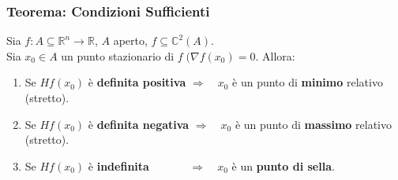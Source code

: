 \documentclass[x11names]{article}
\begin{document}
	\newpage\begin{center}
		\colorbox{myred}{\begin{minipage}{5.75in}
				\begin{redes}{}
					\subsubsection{Teorema: Condizioni Sufficienti}
					Sia $f:A\subseteq\mathbb{R}^n\to\mathbb{R}$, $A$ aperto, $f\subseteq\mathbb{C}^2(A)$.\\
					Sia $x_0\in A$ un punto stazionario di $f\;(\nabla f(x_0)=0$. Allora: \\
					\begin{enumerate}
						\item Se $Hf(x_0)$ è \textbf{definita positiva} $\Longrightarrow\quad x_0$ è un punto di \textbf{minimo} relativo (stretto). 
						\item Se $Hf(x_0)$ è \textbf{definita negativa} $\Longrightarrow\quad x_0$ è un punto di \textbf{massimo} relativo (stretto). 
						\item Se $Hf(x_0)$ è \textbf{indefinita} 
						$\;\quad\quad\quad\Longrightarrow\quad x_0$ è un \textbf{punto di sella}. 
					\end{enumerate}
					
					
				\end{redes}
		\end{minipage}}
	\end{center}
	
\end{document}
